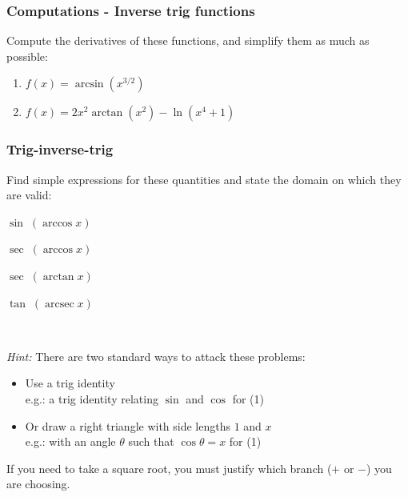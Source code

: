 \documentclass[14pt]{beamer}
\begin{document}
\begin{frame}[t]
	\frametitle{Computations - Inverse trig functions}

	Compute the derivatives of these functions, and simplify them as much as possible:
	\begin{enumerate}
		\item $\displaystyle f(x) = \arcsin \left( x^{3/2}\right)$
			\vfill

		\item $\displaystyle f(x)=2x^{2}\arctan (x^{2}) - \ln (x^{4}+1)$
			\vfill
	\end{enumerate}
\end{frame}

\begin{frame}[t]
	\frametitle{Trig-inverse-trig}

	\begin{block}{}
		Find simple expressions for these quantities and state the domain on which they
		are valid:
		\begin{enumerate}
		\end{enumerate}
		\vspace{-.1cm}
	\end{block}

	\

	{\fontsize{13}{13}\selectfont \emph{Hint:} There are two standard ways to attack these problems: \begin{itemize}\item Use a trig identity \\ e.g.: a trig identity relating $\sin$ and $\cos$ for (1)

	\item Or draw a right triangle with side lengths $1$ and $x$ \\ e.g.: with an angle $\theta$ such that $\cos \theta = x$ for (1)\end{itemize} If you need to take a square root, you must justify which branch ($+$ or $-$) you are choosing. }
\end{frame}
\end{document}
